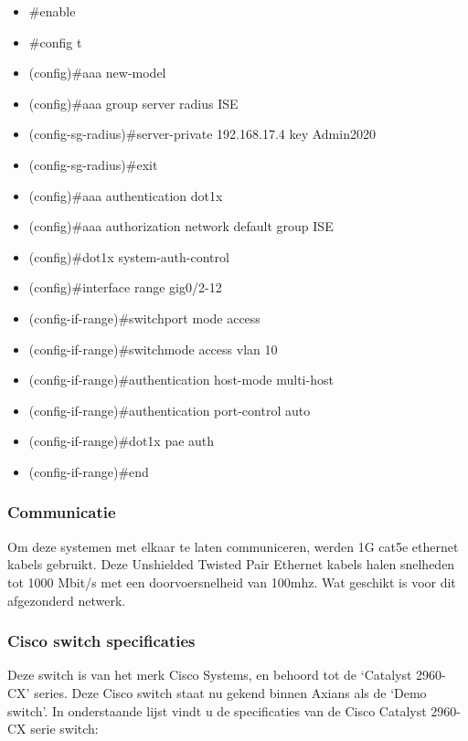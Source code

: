 \begin{itemize}
	\item \#enable
	\item \#config t
	\item (config)\#aaa new-model
	\item (config)\#aaa group server radius ISE
	\item (config-sg-radius)\#server-private 192.168.17.4 key Admin2020
	\item (config-sg-radius)\#exit
	\item (config)\#aaa authentication dot1x
	\item (config)\#aaa authorization network default group ISE
	\item (config)\#dot1x system-auth-control
	\item (config)\#interface range gig0/2-12
	\item (config-if-range)\#switchport mode access
	\item (config-if-range)\#switchmode access vlan 10
	\item (config-if-range)\#authentication host-mode multi-host
	\item (config-if-range)\#authentication port-control auto
	\item (config-if-range)\#dot1x pae auth
	\item (config-if-range)\#end
\end{itemize}

\subsubsection{Communicatie}
Om deze systemen met elkaar te laten communiceren, werden 1G cat5e ethernet kabels gebruikt. Deze Unshielded Twisted Pair Ethernet kabels halen snelheden tot 1000 Mbit/s met een doorvoersnelheid van 100mhz. Wat geschikt is voor dit afgezonderd netwerk.

\subsubsection{Cisco switch specificaties}
Deze switch is van het merk Cisco Systems, en behoord tot de ‘Catalyst 2960-CX’ series. Deze Cisco switch staat nu gekend binnen Axians als de ‘Demo switch’. 
In onderstaande lijst vindt u de specificaties van de Cisco Catalyst 2960-CX serie switch:

